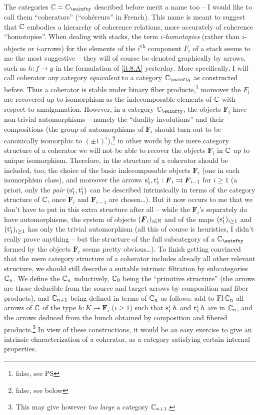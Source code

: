 The categories $\bC=\bC_\oo$ described before merit a name too
-- I would like to call them ``coherators'' (``coh\'ereurs'' in
French). This name is meant to suggest that ${\mathbb{C}}$ embodies a
hierarchy of coherence relations, more accurately of coherence
``homotopies''. When dealing with stacks, the term
\emph{$i$-homotopies} (rather than $i$-objects or $i$-arrows) for the
elements of the $i$\textsuperscript{th} component $F_i$ of a stack
seems to me the most suggestive -- they will of course be denoted
graphically by arrows, such as $h: f\to g$ in the
formulation of \ref{it:8.A} yesterday. More specifically, I will call
coherator any category \emph{equivalent} to a category $\bC_\oo$ as
constructed before. Thus a coherator is stable under binary fiber
products,\footnote{false, see PS} moreover the $F_i$ are recovered up
to isomorphism as the indecomposable elements of ${\mathbb{C}}$ with respect
to amalgamation. However, in a category $\bC_\oo$, the objects
$\boldsymbol F_i$ have non-trivial automorphisms -- namely the ``duality
involutions'' and their compositions (the group of automorphisms of
$\boldsymbol F_i$ should turn out to be canonically isomorphic to
$(\pm1)^i$),\footnote{false, see below} in other words by the mere
category structure of a coherator we will not be able to recover the
objects $\boldsymbol F_i$ in ${\mathbb{C}}$ up to unique isomorphism. Therefore, in
the structure of a coherator should be included, too, the choice of
the basic indecomposable objects $\boldsymbol F_i$ (one in each isomorphism
class), and moreover the arrows $\mathrm{s}_1^i,\mathrm{t}_1^i : \boldsymbol F_i
\rightrightarrows \boldsymbol F_{i-1}$ for $i\ge1$ (a priori, only the
\emph{pair} $(\mathrm{s}_1^i,\mathrm{t}_1^i)$ can be described intrinsically
in terms of the category structure of ${\mathbb{C}}$, once $\boldsymbol F_i$ and
$\boldsymbol F_{i-1}$ are chosen\ldots). But it now occurs to me that we
don't have to put in this extra structure after all -- while the
$\boldsymbol F_i$'s separately do have automorphisms, the system of objects
$(\boldsymbol F_i)_{i\in{\ensuremath{\mathbb{N}}}}$ and of the maps $(\mathrm{s}_1^i)_{i\ge1}$ and $(\mathrm{t}_1^i)_{i\ge1}$ has only the trivial automorphism (all this of course
is heuristics, I didn't really prove anything -- but the structure of
the full subcategory of a $\bC_\oo$ formed by the objects $\boldsymbol F_i$ seems
pretty obvious\ldots). To finish getting convinced that the
mere category structure of a coherator includes already all other
relevant structure, we should still describe a suitable intrinsic
filtration by subcategories ${\mathbb{C}}_n$. We define the ${\mathbb{C}}_n$
inductively, ${\mathbb{C}}_0$ being the ``primitive structure'' (the arrows
are those deducible from the source and target arrows by composition
and fiber products), and ${\mathbb{C}}_{n+1}$ being defined in terms of
${\mathbb{C}}_n$ as follows: add to $\operatorname{Fl} {\mathbb{C}}_n$ all arrows of ${\mathbb{C}}$ of
the type $h: K \to \boldsymbol F_i$ ($i\ge1$) such that $\mathrm{s}_1^i\, h$ and
$\mathrm{t}_1^i\,h$ are in ${\mathbb{C}}_n$, and the arrows deduced from the
bunch obtained by composition and fibered products.\footnote{This may
  give however \emph{too large} a category ${\mathbb{C}}_{n+1}$.} In view of
these constructions, it would be an easy exercise to give an intrinsic
characterization of a coherator, as a category satisfying certain
internal properties.

